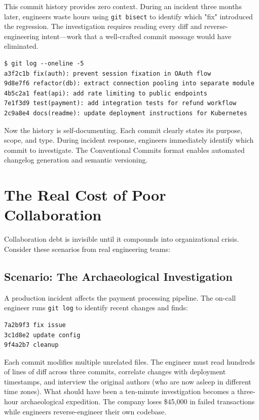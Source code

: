 This commit history provides zero context. During an incident three months later, engineers waste hours using \texttt{git bisect} to identify which "fix" introduced the regression. The investigation requires reading every diff and reverse-engineering intent---work that a well-crafted commit message would have eliminated.

\begin{lstlisting}[style=shell,caption={Systematic collaboration: commits tell a clear story}]
$ git log --oneline -5
a3f2c1b fix(auth): prevent session fixation in OAuth flow
9d8e7f6 refactor(db): extract connection pooling into separate module
4b5c2a1 feat(api): add rate limiting to public endpoints
7e1f3d9 test(payment): add integration tests for refund workflow
2c9a8e4 docs(readme): update deployment instructions for Kubernetes
\end{lstlisting}

Now the history is self-documenting. Each commit clearly states its purpose, scope, and type. During incident response, engineers immediately identify which commit to investigate. The Conventional Commits format enables automated changelog generation and semantic versioning.

\section{The Real Cost of Poor Collaboration}
Collaboration debt is invisible until it compounds into organizational crisis. Consider these scenarios from real engineering teams:

\subsection{Scenario: The Archaeological Investigation}
A production incident affects the payment processing pipeline. The on-call engineer runs \texttt{git log} to identify recent changes and finds:

\begin{lstlisting}[style=shell,caption={Inadequate commit messages force code archaeology}]
7a2b9f3 fix issue
3c1d8e2 update config
9f4a2b7 cleanup
\end{lstlisting}

Each commit modifies multiple unrelated files. The engineer must read hundreds of lines of diff across three commits, correlate changes with deployment timestamps, and interview the original authors (who are now asleep in different time zones). What should have been a ten-minute investigation becomes a three-hour archaeological expedition. The company loses \$45,000 in failed transactions while engineers reverse-engineer their own codebase.

